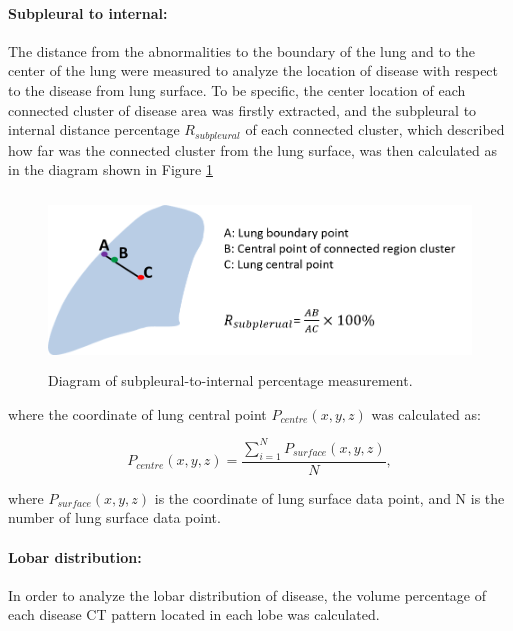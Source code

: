 \paragraph{Subpleural to internal:} The distance from the abnormalities to the boundary of the lung and to the center of the lung were measured to analyze the location of disease with respect to the disease from lung surface. To be specific, the center location of each connected cluster of disease area was firstly extracted, and the subpleural to internal distance percentage $R_{subpleural}$ of each connected cluster, which described how far was the connected cluster from the lung surface, was then calculated as in the diagram shown in Figure \ref{fig:SubpleuralMethod}

\begin{figure}[H]
  \centering 
  \includegraphics[height=1.8in]{QuantitativeAnalysis/Image/SubplesrualMethod.png}
  \caption{Diagram of subpleural-to-internal percentage measurement.}
  \label{fig:SubpleuralMethod}
\end{figure}
%

\noindent where the coordinate of lung central point $P_{centre}(x,y,z)$ was calculated as:

\begin{equation}
P_{centre}(x,y,z) = \frac{\sum\nolimits_{i=1}^N P_{surface}(x,y,z)}{N},
\end{equation}

\noindent where $P_{surface}(x,y,z)$ is the coordinate of lung surface data point, and N is the number of lung surface data point.

\paragraph{Lobar distribution:} In order to analyze the lobar distribution of disease, the volume percentage of each disease CT pattern located in each lobe was calculated.


